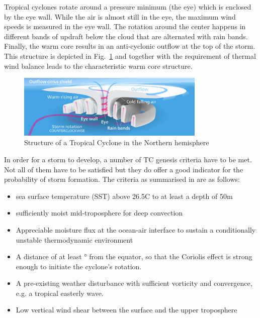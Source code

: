 Tropical cyclones rotate around a pressure minimum (the eye) which is enclosed by the eye wall. While the air is almost still in the eye, the maximum wind speeds is measured in the eye wall. The rotation around the center happens in different bands of updraft below the cloud that are alternated with rain bands. Finally, the warm core results in an anti-cyclonic outflow at the top of the storm. This structure is depicted in Fig.~\ref{fig:tc-structure} and together with the requirement of thermal wind balance leads to the characteristic warm core structure.
\begin{figure}[ht]
	\centering
	\includegraphics[width=0.8\textwidth]{img/hurricane-structure.png}
	\caption{Structure of a Tropical Cyclone in the Northern hemisphere~\cite{hurricane-structure}}
	\label{fig:tc-structure}
\end{figure}
In order for a storm to develop, a number of TC genesis criteria have to be met. Not all of them have to be satisfied but they do offer a good indicator for the probability of storm formation.
The criteria as summarised in \cite{lohmann-storms} are as follows:
\begin{itemize}
	\item sea surface temperature (SST) above 26.5\degree C to at least a depth of 50m
	\item sufficiently moist mid-troposphere for deep convection
	\item Appreciable moisture flux at the ocean-air interface to sustain a conditionally unstable thermodynamic environment \cite{moisture-flux}
	\item A distance of at least \unit[5]{\degree} from the equator, so that the Coriolis effect is strong enough to initiate the cyclone's rotation. \cite{coriolis}
	\item A pre-existing weather disturbance with sufficient vorticity and convergence, e.g. a tropical easterly wave.
	\item Low vertical wind shear between the surface and the upper troposphere
\end{itemize}


